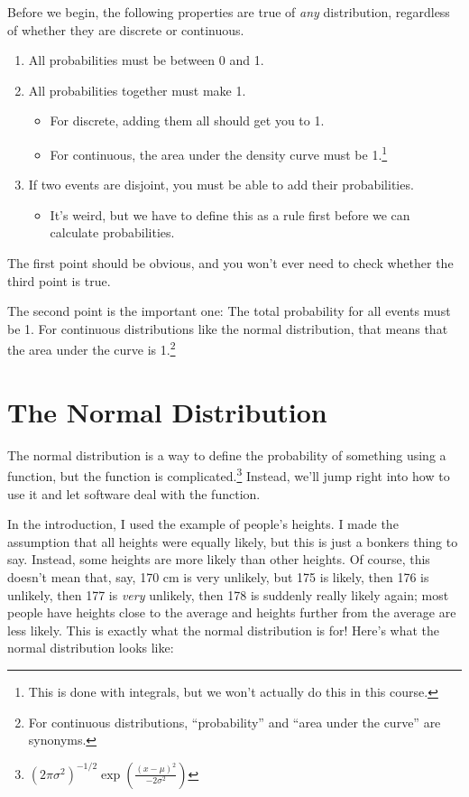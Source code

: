 \documentclass[
  letterpaper,
  DIV=11,
  numbers=noendperiod,
  oneside]{scrreprt}
\providecommand{\tightlist}{%
  \setlength{\itemsep}{0pt}\setlength{\parskip}{0pt}}\usepackage{longtable,booktabs,array}
\begin{document}
Before we begin, the following properties are true of \emph{any}
distribution, regardless of whether they are discrete or continuous.

\begin{enumerate}
\def\labelenumi{\arabic{enumi}.}
\tightlist
\item
  All probabilities must be between 0 and 1.
\item
  All probabilities together must make 1.

  \begin{itemize}
  \tightlist
  \item
    For discrete, adding them all should get you to 1.
  \item
    For continuous, the area under the density curve must be
    1.\footnote{This is done with integrals, but we won't actually do
      this in this course.}
  \end{itemize}
\item
  If two events are disjoint, you must be able to add their
  probabilities.

  \begin{itemize}
  \tightlist
  \item
    It's weird, but we have to define this as a rule first before we can
    calculate probabilities.
  \end{itemize}
\end{enumerate}

The first point should be obvious, and you won't ever need to check
whether the third point is true.

The second point is the important one: The total probability for all
events must be 1. For continuous distributions like the normal
distribution, that means that the area under the curve is 1.\footnote{For
  continuous distributions, ``probability'' and ``area under the curve''
  are synonyms.}

\hypertarget{the-normal-distribution}{%
\section{The Normal Distribution}\label{the-normal-distribution}}

The normal distribution is a way to define the probability of something
using a function, but the function is complicated.\footnote{\((2\pi\sigma^2)^{-1/2}\exp\left(\frac{(x-\mu)^2}{-2\sigma^2}\right)\)}
Instead, we'll jump right into how to use it and let software deal with
the function.

In the introduction, I used the example of people's heights. I made the
assumption that all heights were equally likely, but this is just a
bonkers thing to say. Instead, some heights are more likely than other
heights. Of course, this doesn't mean that, say, 170 cm is very
unlikely, but 175 is likely, then 176 is unlikely, then 177 is
\emph{very} unlikely, then 178 is suddenly really likely again; most
people have heights close to the average and heights further from the
average are less likely. This is exactly what the normal distribution is
for! Here's what the normal distribution looks like:
\end{document}
